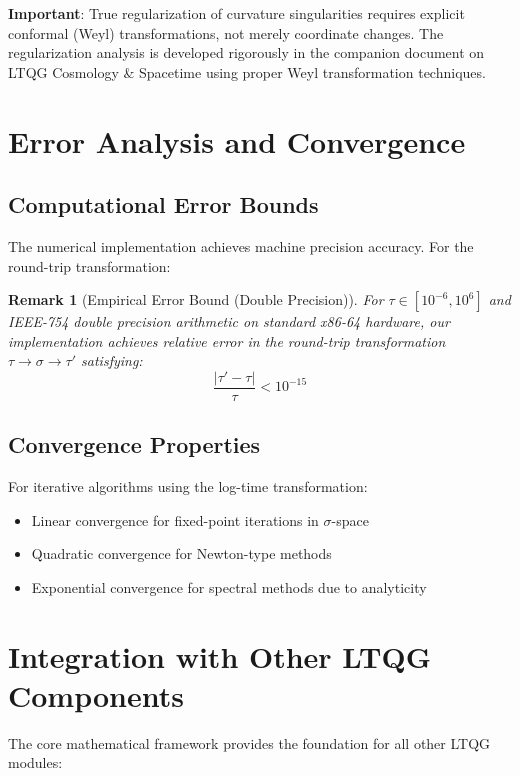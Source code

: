 \documentclass[11pt,a4paper]{article}
\newtheorem{remark}[theorem]{Remark}
\begin{document}
\textbf{Important}: True regularization of curvature singularities requires explicit conformal (Weyl) transformations, not merely coordinate changes. The regularization analysis is developed rigorously in the companion document on LTQG Cosmology \& Spacetime using proper Weyl transformation techniques.

\section{Error Analysis and Convergence}

\subsection{Computational Error Bounds}

The numerical implementation achieves machine precision accuracy. For the round-trip transformation:

\begin{remark}[Empirical Error Bound (Double Precision)]
For $\tau \in [10^{-6}, 10^6]$ and IEEE-754 double precision arithmetic on standard x86-64 hardware, our implementation achieves relative error in the round-trip transformation $\tau \to \sigma \to \tau'$ satisfying:
\begin{equation}
\frac{|\tau' - \tau|}{\tau} < 10^{-15}
\end{equation}
\end{remark}

\subsection{Convergence Properties}

For iterative algorithms using the log-time transformation:

\begin{itemize}
\item Linear convergence for fixed-point iterations in $\sigma$-space
\item Quadratic convergence for Newton-type methods
\item Exponential convergence for spectral methods due to analyticity
\end{itemize}

\section{Integration with Other LTQG Components}

The core mathematical framework provides the foundation for all other LTQG modules:
\end{document}
